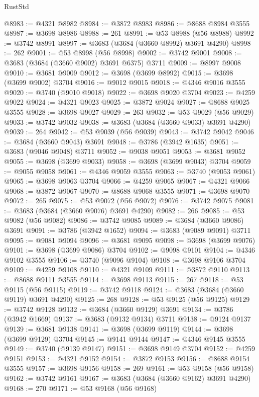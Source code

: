 \begin{lexlean}{RustStd}
\begin{coremodule}
@8983 := @4321 @8982
@8984 := @3872 @8983
@8986 := @8688 @8984 @3555
@8987 := @3698 @8986
@8988 := 261
@8991 := @53 @8988 (@56 @8988)
@8992 := @3742 @8991
@8997 := @3683 (@3684 (@3660 @8992) @3691 @4290)
@8998 := 262
@9001 := @53 @8998 (@56 @8998)
@9002 := @3742 @9001
@9008 := @3683 (@3684 (@3660 @9002) @3691 @6375) @3711
@9009 := @8997 @9008
@9010 := @3681 @9009
@9012 := @3698 (@3699 @8992)
@9015 := @3698 (@3699 @9002) @3704
@9016 := @9012 @9015
@9018 := @4346 @9016 @3555
@9020 := @3740 (@9010 @9018)
@9022 := @3698 @9020 @3704
@9023 := @4259 @9022
@9024 := @4321 @9023
@9025 := @3872 @9024
@9027 := @8688 @9025 @3555
@9028 := @3698 @9027
@9029 := 263
@9032 := @53 @9029 (@56 @9029)
@9033 := @3742 @9032
@9038 := @3683 (@3684 (@3660 @9033) @3691 @4290)
@9039 := 264
@9042 := @53 @9039 (@56 @9039)
@9043 := @3742 @9042
@9046 := @3684 (@3660 @9043) @3691
@9048 := @3786 (@3942 @1635)
@9051 := @3683 (@9046 @9048) @3711
@9052 := @9038 @9051
@9053 := @3681 @9052
@9055 := @3698 (@3699 @9033)
@9058 := @3698 (@3699 @9043) @3704
@9059 := @9055 @9058
@9061 := @4346 @9059 @3555
@9063 := @3740 (@9053 @9061)
@9065 := @3698 @9063 @3704
@9066 := @4259 @9065
@9067 := @4321 @9066
@9068 := @3872 @9067
@9070 := @8688 @9068 @3555
@9071 := @3698 @9070
@9072 := 265
@9075 := @53 @9072 (@56 @9072)
@9076 := @3742 @9075
@9081 := @3683 (@3684 (@3660 @9076) @3691 @4290)
@9082 := 266
@9085 := @53 @9082 (@56 @9082)
@9086 := @3742 @9085
@9089 := @3684 (@3660 @9086) @3691
@9091 := @3786 (@3942 @1652)
@9094 := @3683 (@9089 @9091) @3711
@9095 := @9081 @9094
@9096 := @3681 @9095
@9098 := @3698 (@3699 @9076)
@9101 := @3698 (@3699 @9086) @3704
@9102 := @9098 @9101
@9104 := @4346 @9102 @3555
@9106 := @3740 (@9096 @9104)
@9108 := @3698 @9106 @3704
@9109 := @4259 @9108
@9110 := @4321 @9109
@9111 := @3872 @9110
@9113 := @8688 @9111 @3555
@9114 := @3698 @9113
@9115 := 267
@9118 := @53 @9115 (@56 @9115)
@9119 := @3742 @9118
@9124 := @3683 (@3684 (@3660 @9119) @3691 @4290)
@9125 := 268
@9128 := @53 @9125 (@56 @9125)
@9129 := @3742 @9128
@9132 := @3684 (@3660 @9129) @3691
@9134 := @3786 (@3942 @1669)
@9137 := @3683 (@9132 @9134) @3711
@9138 := @9124 @9137
@9139 := @3681 @9138
@9141 := @3698 (@3699 @9119)
@9144 := @3698 (@3699 @9129) @3704
@9145 := @9141 @9144
@9147 := @4346 @9145 @3555
@9149 := @3740 (@9139 @9147)
@9151 := @3698 @9149 @3704
@9152 := @4259 @9151
@9153 := @4321 @9152
@9154 := @3872 @9153
@9156 := @8688 @9154 @3555
@9157 := @3698 @9156
@9158 := 269
@9161 := @53 @9158 (@56 @9158)
@9162 := @3742 @9161
@9167 := @3683 (@3684 (@3660 @9162) @3691 @4290)
@9168 := 270
@9171 := @53 @9168 (@56 @9168)

\end{coremodule}
\end{lexlean}
